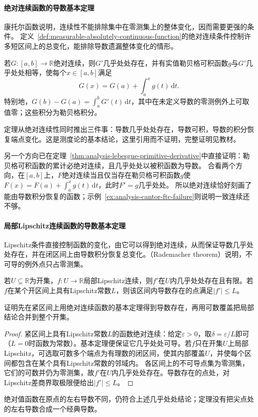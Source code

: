 \paragraph{绝对连续函数的导数基本定理}
康托尔函数说明，连续性不能排除集中在零测集上的整体变化，因而需要更强的条件。
定义~\ref{def:measurable-absolutely-continuous-function}的绝对连续条件控制许多短区间上的总变化，能排除导数遗漏整体变化的情形。
\begin{theorem}[绝对连续函数的导数积分]
\label{thm:measurable-absolute-continuity-ftc}
若$G:[a,b]\to\mathbb R$绝对连续，则$G'$几乎处处存在，并有实值勒贝格可积函数$g$与$G'$几乎处处相等，使每个$x\in[a,b]$满足
\begin{equation}
 G(x)=G(a)+\int_a^xg(t)\,\mathrm dt.
\label{eq:measurable-absolute-continuity-representation}
\end{equation}
特别地，$G(b)-G(a)=\int_a^bG'(t)\,\mathrm dt$，其中在未定义导数的零测例外上可取值零；这些积分为勒贝格积分。
\end{theorem}
定理从绝对连续性同时推出三件事：导数几乎处处存在，导数可积，导数的积分恢复端点变化。这是测度论的基本结论，这里引用而不证明，完整证明见教材。

另一个方向已在定理~\ref{thm:analysis-lebesgue-primitive-derivative}中直接证明：勒贝格可积函数的累计必绝对连续，且几乎处处以被积函数为导数。
合看两个方向，在$[a,b]$上，$F$绝对连续当且仅当存在勒贝格可积函数$g$使
$F(x)=F(a)+\int_a^xg(t)\,\mathrm dt$，此时$F'=g$几乎处处。
所以绝对连续恰好刻画了能由导数积分恢复的函数；示例~\ref{ex:analysis-cantor-ftc-failure}则说明一致连续还不够。

\paragraph{局部Lipschitz连续函数的导数基本定理}
Lipschitz条件直接控制函数的变化，由它可以得到绝对连续，从而保证导数几乎处处存在，并在闭区间上由导数积分恢复总变化。（Rademacher theorem）说明，不可导的例外点只占零测集。
\begin{theorem}[一维Rademacher定理]
\label{thm:measurable-rademacher}
若$U\subseteq\mathbb R$为开集，$f:U\to\mathbb R$局部Lipschitz连续，则$f'$在$U$内几乎处处存在且有限。若$f$在某个开区间上具有Lipschitz常数$L$，则该区间内导数存在的点满足$|f'|\leq L$。
\end{theorem}
证明先在紧区间上用绝对连续函数的基本定理得到导数存在，再用可数覆盖把局部结论合并到整个开集。
\label{sec:analysis-rademacher-proof}
\begin{proof}
紧区间上具有Lipschitz常数$L$的函数绝对连续：给定$\varepsilon>0$，取$\delta=\varepsilon/L$即可（$L=0$时函数为常数）。基本定理便保证它几乎处处可导。若$f$只在开集$U$上局部Lipschitz，可选取可数多个端点为有理数的闭区间，使其内部覆盖$U$，并使每个区间都包含在某个具有Lipschitz常数的邻域内。
各区间上的不可导点集为零测集，它们的可数并仍为零测集，故$f'$在$U$内几乎处处存在。导数存在的点处，对Lipschitz差商界取极限便给出$|f'|\leq L$。
\end{proof}
绝对值函数在原点的左右导数不同，仍符合上述几乎处处结论；定理没有把尖点处的左右导数合成一个经典导数。

